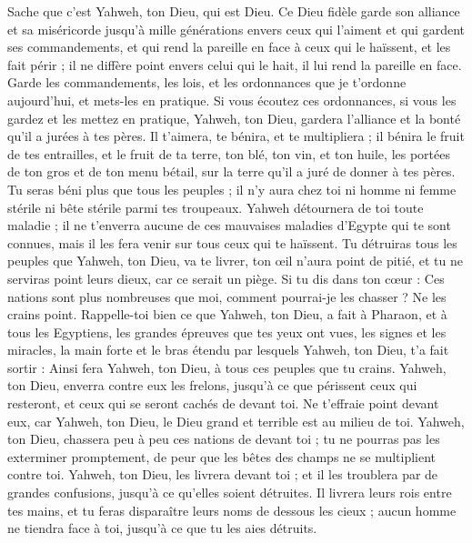 \begin{multicols}{2}
Sache que c'est Yahweh, ton Dieu, qui est Dieu. Ce Dieu fidèle garde son alliance et sa miséricorde jusqu'à mille générations envers ceux qui l'aiment et qui gardent ses commandements,
et qui rend la pareille en face à ceux qui le haïssent, et les fait périr ; il ne diffère point envers celui qui le hait, il lui rend la pareille en face.
Garde les commandements, les lois, et les ordonnances que je t'ordonne aujourd'hui, et mets-les en pratique.
Si vous écoutez ces ordonnances, si vous les gardez et les mettez en pratique, Yahweh, ton Dieu, gardera l'alliance et la bonté qu'il a jurées à tes pères.
Il t'aimera, te bénira, et te multipliera ; il bénira le fruit de tes entrailles, et le fruit de ta terre, ton blé, ton vin, et ton huile, les portées de ton gros et de ton menu bétail, sur la terre qu'il a juré de donner à tes pères.
Tu seras béni plus que tous les peuples ; il n'y aura chez toi ni homme ni femme stérile ni bête stérile parmi tes troupeaux.
Yahweh détournera de toi toute maladie ; il ne t'enverra aucune de ces mauvaises maladies d'Egypte qui te sont connues, mais il les fera venir sur tous ceux qui te haïssent.
Tu détruiras tous les peuples que Yahweh, ton Dieu, va te livrer, ton œil n'aura point de pitié, et tu ne serviras point leurs dieux, car ce serait un piège.
Si tu dis dans ton cœur : Ces nations sont plus nombreuses que moi, comment pourrai-je les chasser ?
Ne les crains point. Rappelle-toi bien ce que Yahweh, ton Dieu, a fait à Pharaon, et à tous les Egyptiens,
les grandes épreuves que tes yeux ont vues, les signes et les miracles, la main forte et le bras étendu par lesquels Yahweh, ton Dieu, t'a fait sortir : Ainsi fera Yahweh, ton Dieu, à tous ces peuples que tu crains.
Yahweh, ton Dieu, enverra contre eux les frelons, jusqu'à ce que périssent ceux qui resteront, et ceux qui se seront cachés de devant toi.
Ne t'effraie point devant eux, car Yahweh, ton Dieu, le Dieu grand et terrible est au milieu de toi.
Yahweh, ton Dieu, chassera peu à peu ces nations de devant toi ; tu ne pourras pas les exterminer promptement, de peur que les bêtes des champs ne se multiplient contre toi.
Yahweh, ton Dieu, les livrera devant toi ; et il les troublera par de grandes confusions, jusqu'à ce qu'elles soient détruites.
Il livrera leurs rois entre tes mains, et tu feras disparaître leurs noms de dessous les cieux ; aucun homme ne tiendra face à toi, jusqu'à ce que tu les aies détruits.

\end{multicols}
